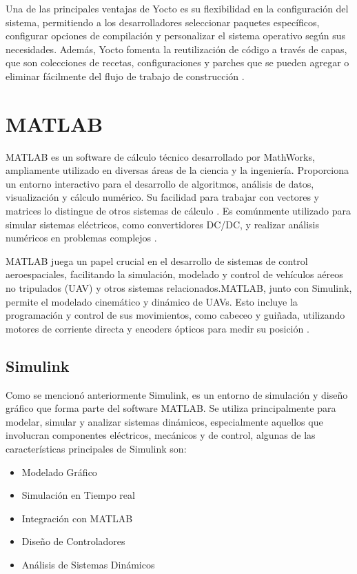 Una de las principales ventajas de Yocto es su flexibilidad en la configuración del sistema, permitiendo a los desarrolladores seleccionar paquetes específicos, 
configurar opciones de compilación y personalizar el sistema operativo según sus necesidades. Además, Yocto fomenta la reutilización de código a través de capas, 
que son colecciones de recetas, configuraciones y parches que se pueden agregar o eliminar fácilmente del flujo de trabajo de construcción \cite{Leppakoski2013FrameworkFI}.

\section{MATLAB}
MATLAB es un software de cálculo técnico desarrollado por MathWorks, ampliamente utilizado en diversas áreas de la ciencia y la ingeniería. Proporciona un entorno interactivo para el desarrollo de algoritmos, análisis de datos, visualización y cálculo numérico. Su facilidad para trabajar con vectores y matrices lo distingue de otros sistemas de cálculo \cite{PealozaLuna2022SimulacinDU}. Es comúnmente utilizado para simular sistemas eléctricos, como convertidores DC/DC, y realizar análisis numéricos en problemas complejos \cite{OrdezGarca2022MatlabCU}. 

MATLAB juega un papel crucial en el desarrollo de sistemas de control aeroespaciales, facilitando la simulación, modelado y control de vehículos aéreos no tripulados (UAV) y otros sistemas relacionados.MATLAB, junto con Simulink, permite el modelado cinemático y dinámico de UAVs. Esto incluye la programación y control de sus movimientos, como cabeceo y guiñada, utilizando motores de corriente directa y encoders ópticos para medir su posición \cite{Senz2020LaboratorioPE} \cite{ChvezGudio2023DesarrolloYC}.

\subsection{Simulink}

Como se mencionó anteriormente Simulink, es un entorno de simulación y diseño gráfico que forma parte del software MATLAB. Se utiliza principalmente para modelar, simular y analizar sistemas dinámicos, especialmente aquellos que involucran componentes eléctricos, mecánicos y de control, algunas  de las características principales de Simulink son:

\begin{itemize}
    \item Modelado Gráfico
    \item Simulación en Tiempo real
    \item Integración con MATLAB
    \item Diseño de Controladores
    \item Análisis de Sistemas Dinámicos
\end{itemize}

